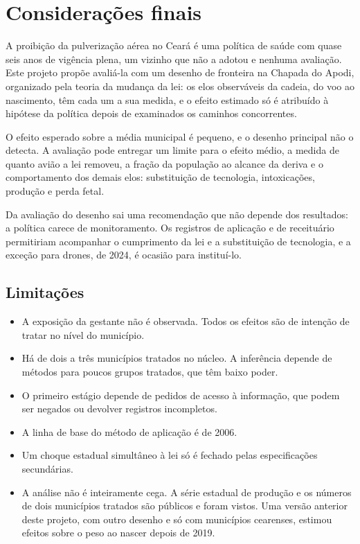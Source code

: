 \chapter{Considerações finais}
\label{sec:conclusao}

A proibição da pulverização aérea no Ceará é uma política de saúde com quase
seis anos de vigência plena, um vizinho que não a adotou e nenhuma avaliação. Este
projeto propõe avaliá-la com um desenho de fronteira na Chapada do Apodi,
organizado pela teoria da mudança da lei: os elos observáveis da cadeia, do voo
ao nascimento, têm cada um a sua medida, e o efeito estimado só é atribuído à
hipótese da política depois de examinados os caminhos concorrentes.

O efeito esperado sobre a média municipal é pequeno, e o desenho principal não
o detecta. A avaliação pode entregar um limite para o efeito médio, a medida de
quanto avião a lei removeu, a fração da população ao alcance da deriva e o
comportamento dos demais elos: substituição de tecnologia, intoxicações,
produção e perda fetal.

Da avaliação do desenho sai uma recomendação que não depende dos resultados: a
política carece de monitoramento. Os registros de aplicação e de receituário
permitiriam acompanhar o cumprimento da lei e a substituição de tecnologia, e a
exceção para drones, de 2024, é ocasião para instituí-lo.

\section{Limitações}

\begin{itemize}
\item A exposição da gestante não é observada. Todos os efeitos são de
intenção de tratar no nível do município.
\item Há de dois a três municípios tratados no núcleo. A inferência depende de
métodos para poucos grupos tratados, que têm baixo poder.
\item O primeiro estágio depende de pedidos de acesso à informação, que podem
ser negados ou devolver registros incompletos.
\item A linha de base do método de aplicação é de 2006.
\item Um choque estadual simultâneo à lei só é fechado pelas especificações
secundárias.
\item A análise não é inteiramente cega. A série estadual de produção e os
números de dois municípios tratados são públicos e foram vistos. Uma versão
anterior deste projeto, com outro desenho e só com municípios cearenses,
estimou efeitos sobre o peso ao nascer depois de 2019.
\end{itemize}
